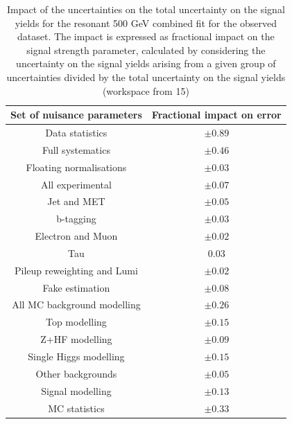 \begin{table}
\centering
\begin{tabular}{|c|c|}
\hline
Set of nuisance parameters & Fractional impact on error\\
\hline
Data statistics & $\pm 0.89$\\
Full systematics & $\pm 0.46$\\
\hline
Floating normalisations & $\pm 0.03$\\
\hline
All experimental & $\pm 0.07$\\
Jet and MET & $\pm 0.05$ \\
b-tagging & $\pm 0.03$\\
Electron and Muon & $\pm 0.02$\\
Tau & $0.03$\\
Pileup reweighting and Lumi & $\pm 0.02$\\
\hline
Fake estimation & $\pm 0.08$\\
\hline
All MC background modelling & $\pm 0.26$\\
Top modelling & $\pm 0.15$\\ 
Z+HF modelling & $\pm 0.09$\\
Single Higgs modelling & $\pm 0.15$\\
Other backgrounds & $\pm 0.05$\\
\hline
Signal modelling & $\pm 0.13$\\
\hline
MC statistics & $\pm 0.33$\\
\hline
\end{tabular}
\caption{Impact of the uncertainties on the total uncertainty on the signal yields for the resonant 500 GeV combined fit for the observed dataset. The impact is expressed as fractional impact on the signal strength parameter,  calculated by considering the uncertainty on the signal yields arising from a given group of uncertainties divided by the total uncertainty on the signal yields  (workspace from 15)}
\label{sec:fit:tab:CombBreakdown2HDM500Observed}
\end{table}

